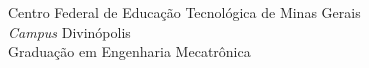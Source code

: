 \vspace*{1.0cm}

\begin{center}
{\sc  Centro Federal de Educação Tecnológica de Minas Gerais\\ {\em Campus} Divinópolis\\ Graduação em Engenharia Mecatrônica}
\end{center}

\vspace*{3.0cm}

\begin{center}
\large \autor %
\end{center}


\vspace*{2.5cm}

\begin{center}
{\sc  \titulo} %
\end{center}

\vspace*{4cm}

\columnwidth
\centerline{}

\null\vfill

\begin{center}
\cidade\\\ano %
\end{center}


\thispagestyle{empty}

\newpage
\vspace*{1.2cm}

\begin{center}
\large \autor %
\end{center}


\vspace*{3.0cm}

\begin{center}
{\sc \titulo}  %
\end{center}

